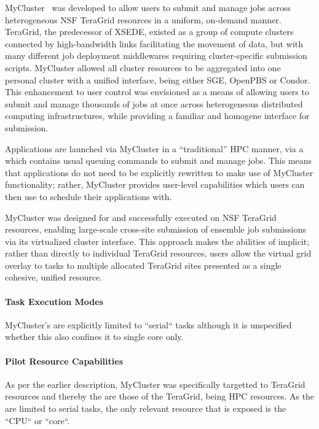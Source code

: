 \documentclass{sig-alternate}
\begin{document}
MyCluster~\cite{1652061} was developed to allow users to submit and manage jobs
across heterogeneous NSF TeraGrid resources in a uniform, on-demand manner.
TeraGrid, the predecessor of XSEDE, existed as a group of compute clusters
connected by high-bandwidth links facilitating the movement of data, but with
many different job deployment middlewares requiring cluster-specific submission
scripts.
MyCluster allowed all cluster resources to be aggregated into one personal
cluster with a unified interface, being either SGE, OpenPBS or Condor.
This enhancement to user control was envisioned as a means of allowing users to
submit and manage thousands of jobs at once across heterogeneous distributed
computing infrastructures, while providing a familiar and homogene interface
for submission.

Applications are launched via MyCluster in a ``traditional'' HPC manner, via a
 which contains usual queuing commands to submit
and manage jobs.
This means that applications do not need to be explicitly rewritten to make use
of MyCluster functionality; rather, MyCluster provides user-level \pilot
capabilities which users can then use to schedule their applications with.

MyCluster was designed for and successfully executed on NSF TeraGrid
resources, enabling large-scale cross-site submission of ensemble
job submissions via its virtualized cluster interface.
This approach makes the  abilities
of \pilot implicit; rather than directly 
to individual TeraGrid resources, users allow the virtual grid
overlay to  tasks to multiple allocated TeraGrid sites
presented as a single cohesive, unified resource.

\paragraph{Task Execution Modes}
MyCluster's  are explicitly limited to
``serial`` tasks although it is unspecified whether this also confines
it to single core  only.

\paragraph{Pilot Resource Capabilities}
As per the earlier description, MyCluster was specifically targetted to
TeraGrid resources and thereby the  are
those of the TeraGrid, being HPC resources.
As the  are limited to serial tasks, the only
relevant resource that is exposed is the ``CPU`` or ``core``.
\end{document}
